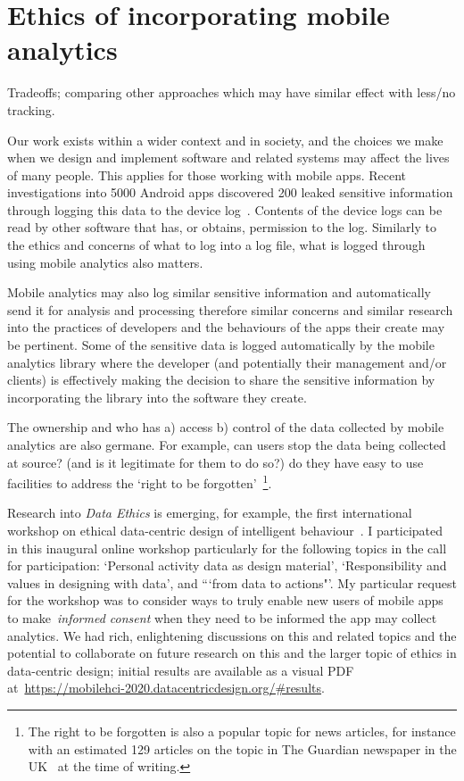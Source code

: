 \section{Ethics of incorporating mobile analytics}
Tradeoffs; comparing other approaches which may have similar effect with less/no tracking.

Our work exists within a wider context and in society, and the choices we make when we design and implement software and related systems may affect the lives of many people. This applies for those working with mobile apps. Recent investigations into 5000 Android apps discovered 200 leaked sensitive information through logging this data to the device log~\citep{zhou2020_mobilogleak}. Contents of the device logs can be read by other software that has, or obtains, permission to the log. 
%
Similarly to the ethics and concerns of what to log into a log file, what is logged through using mobile analytics also matters.

Mobile analytics may also log similar sensitive information and automatically send it for analysis and processing therefore similar concerns and similar research into the practices of developers and the behaviours of the apps their create may be pertinent. Some of the sensitive data is logged automatically by the mobile analytics library where the developer (and potentially their management and/or clients) is effectively making the decision to share the sensitive information by incorporating the library into the software they create.

The ownership and who has a) access b) control of the data collected by mobile analytics are also germane. For example, can users stop the data being collected at source? (and is it legitimate for them to do so?) do they have easy to use facilities to address the `right to be forgotten'~\citep{gdpr_article_17_right_to_erasure}\footnote{The right to be forgotten is also a popular topic for news articles, for instance with an estimated 129 articles on the topic in The Guardian newspaper in the UK~\citep{guardiannewspaper_right_to_be_forgotten_articles} at the time of writing.}. 

Research into \emph{Data Ethics} is emerging, for example, the first international workshop on ethical data-centric design of intelligent behaviour~\citep{datethics2020_workshop}. I participated in this inaugural online workshop particularly for the following topics in the call for participation: `Personal activity data as design material', `Responsibility and values in designing with data', and ```from data to actions"'. My particular request for the workshop was to consider ways to truly enable new users of mobile apps to make~\emph{informed consent} when they need to be informed the app may collect analytics. We had rich, enlightening discussions on this and related topics and the potential to collaborate on future research on this and the larger topic of ethics in data-centric design; initial results are available as a visual PDF at~\url{https://mobilehci-2020.datacentricdesign.org/#results}.


